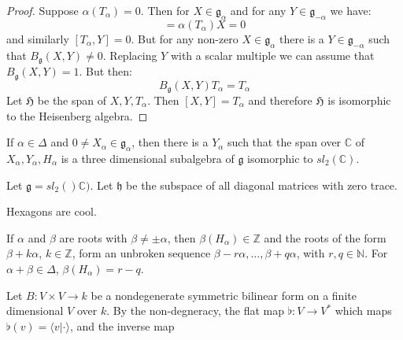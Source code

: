     \begin{proof}
        Suppose $\alpha(T_{\alpha})=0$. Then for $X\in\mathfrak{g}_{\alpha}$
        and for any $Y\in\mathfrak{g}_{\minus\alpha}$ we have:
        \begin{equation}
            [T_{\alpha},X]=\alpha(T_{\alpha})X=0
        \end{equation}
        and similarly $[T_{\alpha},Y]=0$. But for any non-zero
        $X\in\mathfrak{g}_{\alpha}$ there is a
        $Y\in\mathfrak{g}_{\minus\alpha}$ such that
        $B_{\mathfrak{g}}(X,Y)\ne{0}$. Replacing $Y$ with a scalar multiple
        we can assume that $B_{\mathfrak{g}}(X,Y)=1$. But then:
        \begin{equation}
            B_{\mathfrak{g}}(X,Y)T_{\alpha}=T_{\alpha}
        \end{equation}
        Let $\mathfrak{H}$ be the span of $X,Y,T_{\alpha}$. Then
        $[X,Y]=T_{\alpha}$ and therefore $\mathfrak{H}$ is isomorphic to the
        Heisenberg algebra.
    \end{proof}
    \begin{theorem}
        If $\alpha\in\Delta$ and $0\ne{X}_{\alpha}\in\mathfrak{g}_{\alpha}$,
        then there is a $Y_{\alpha}$ such that the span over $\mathbb{C}$ of
        $X_{\alpha},Y_{\alpha},H_{\alpha}$ is a three dimensional subalgebra
        of $\mathfrak{g}$ isomorphic to $sl_{2}(\mathbb{C})$.
    \end{theorem}
    \begin{example}
        Let $\mathfrak{g}=sl_{2}()\mathbb{C})$. Let $\mathfrak{h}$ be the
        subspace of all diagonal matrices with zero trace.
    \end{example}
    \begin{example}
        Hexagons are cool.
    \end{example}
    \begin{theorem}
        If $\alpha$ and $\beta$ are roots with $\beta\ne\pm\alpha$, then
        $\beta(H_{\alpha})\in\mathbb{Z}$ and the roots of the form
        $\beta+k\alpha$, $k\in\mathbb{Z}$, form an unbroken sequence
        $\beta-r\alpha,\dots,\beta+q\alpha$, with $r,q\in\mathbb{N}$. For
        $\alpha+\beta\in\Delta$, $\beta(H_{\alpha})=r-q$.
    \end{theorem}
    Let $B:V\times{V}\rightarrow{k}$ be a nondegenerate symmetric bilinear
    form on a finite dimensional $V$ over $k$. By the non-degneracy, the
    flat map $\flat:V\rightarrow{V}^{*}$ which maps
    $\flat(v)=\langle{v}|\cdot\rangle$, and the inverse map
